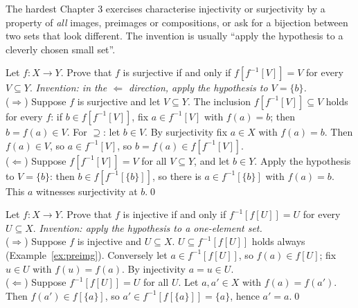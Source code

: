 The hardest Chapter 3 exercises characterise injectivity or surjectivity by a property of \emph{all} images, preimages or compositions, or ask for a bijection between two sets that look different. The invention is usually ``apply the hypothesis to a cleverly chosen small set''.

\begin{bexample}
Let $f:X\to Y$. Prove that $f$ is surjective if and only if $f[f^{-1}[V]]=V$ for every $V\subseteq Y$.
\solution
\emph{Invention: in the $\Leftarrow$ direction, apply the hypothesis to $V=\{b\}$.}\\
($\Rightarrow$) Suppose $f$ is surjective and let $V\subseteq Y$. The inclusion $f[f^{-1}[V]]\subseteq V$ holds for every $f$: if $b\in f[f^{-1}[V]]$, fix $a\in f^{-1}[V]$ with $f(a)=b$; then $b=f(a)\in V$. For $\supseteq$: let $b\in V$. By surjectivity fix $a\in X$ with $f(a)=b$. Then $f(a)\in V$, so $a\in f^{-1}[V]$, so $b=f(a)\in f[f^{-1}[V]]$.\\
($\Leftarrow$) Suppose $f[f^{-1}[V]]=V$ for all $V\subseteq Y$, and let $b\in Y$. Apply the hypothesis to $V=\{b\}$: then $b\in f[f^{-1}[\{b\}]]$, so there is $a\in f^{-1}[\{b\}]$ with $f(a)=b$. This $a$ witnesses surjectivity at $b$.\qed
\end{bexample}

\begin{bexample}
Let $f:X\to Y$. Prove that $f$ is injective if and only if $f^{-1}[f[U]]=U$ for every $U\subseteq X$.
\solution
\emph{Invention: apply the hypothesis to a one-element set.}\\
($\Rightarrow$) Suppose $f$ is injective and $U\subseteq X$. $U\subseteq f^{-1}[f[U]]$ holds always (Example~\ref{ex:preimg}). Conversely let $a\in f^{-1}[f[U]]$, so $f(a)\in f[U]$; fix $u\in U$ with $f(u)=f(a)$. By injectivity $a=u\in U$.\\
($\Leftarrow$) Suppose $f^{-1}[f[U]]=U$ for all $U$. Let $a,a'\in X$ with $f(a)=f(a')$. Then $f(a')\in f[\{a\}]$, so $a'\in f^{-1}[f[\{a\}]]=\{a\}$, hence $a'=a$.\qed
\end{bexample}

